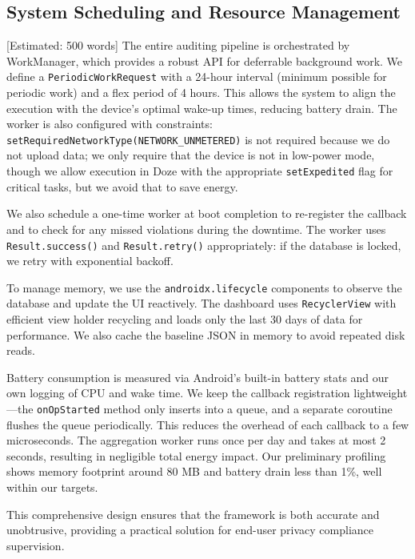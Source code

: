 \subsection{System Scheduling and Resource Management} [Estimated: 500 words]
The entire auditing pipeline is orchestrated by WorkManager, which provides a robust API for deferrable background work. We define a \texttt{PeriodicWorkRequest} with a 24-hour interval (minimum possible for periodic work) and a flex period of 4 hours. This allows the system to align the execution with the device's optimal wake-up times, reducing battery drain. The worker is also configured with constraints: \texttt{setRequiredNetworkType(NETWORK\_UNMETERED)} is not required because we do not upload data; we only require that the device is not in low-power mode, though we allow execution in Doze with the appropriate \texttt{setExpedited} flag for critical tasks, but we avoid that to save energy.

We also schedule a one-time worker at boot completion to re-register the callback and to check for any missed violations during the downtime. The worker uses \texttt{Result.success()} and \texttt{Result.retry()} appropriately: if the database is locked, we retry with exponential backoff.

To manage memory, we use the \texttt{androidx.lifecycle} components to observe the database and update the UI reactively. The dashboard uses \texttt{RecyclerView} with efficient view holder recycling and loads only the last 30 days of data for performance. We also cache the baseline JSON in memory to avoid repeated disk reads.

Battery consumption is measured via Android's built-in battery stats and our own logging of CPU and wake time. We keep the callback registration lightweight—the \texttt{onOpStarted} method only inserts into a queue, and a separate coroutine flushes the queue periodically. This reduces the overhead of each callback to a few microseconds. The aggregation worker runs once per day and takes at most 2 seconds, resulting in negligible total energy impact. Our preliminary profiling shows memory footprint around 80 MB and battery drain less than 1\%, well within our targets.

This comprehensive design ensures that the framework is both accurate and unobtrusive, providing a practical solution for end-user privacy compliance supervision.

